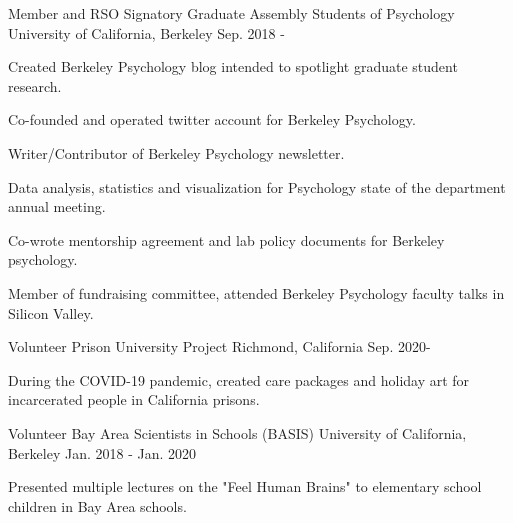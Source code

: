 

\begin{cventries}

  \cventry
    {Member and RSO Signatory} %
    {Graduate Assembly Students of Psychology} 
    {University of California, Berkeley} %
    {Sep. 2018 - } %
    {
      \begin{cvitems} %
        \item {Created Berkeley Psychology blog intended to spotlight graduate student research.}
        \item {Co-founded and operated twitter account for Berkeley Psychology.}
        \item {Writer/Contributor of Berkeley Psychology newsletter.}
        \item {Data analysis, statistics and visualization for Psychology state of the department annual meeting.}
        \item {Co-wrote mentorship agreement and lab policy documents for Berkeley psychology.}
        \item {Member of fundraising committee, attended Berkeley Psychology faculty talks in Silicon Valley.}
      \end{cvitems}
    }
    
  \cventry
    {Volunteer} %
    {Prison University Project} 
    {Richmond, California} %
    {Sep. 2020-} %
    {
      \begin{cvitems} %
        \item {During the COVID-19 pandemic, created care packages and holiday art for incarcerated people in California prisons.}
      \end{cvitems}
    }
    
  \cventry
    {Volunteer} %
    {Bay Area Scientists in Schools (BASIS)} 
    {University of California, Berkeley} %
    {Jan. 2018 - Jan. 2020} %
    {
      \begin{cvitems} %
        \item {Presented multiple lectures on the "Feel Human Brains" to elementary school children in Bay Area schools.}
      \end{cvitems}
    }
    

\end{cventries}
